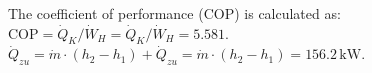 The coefficient of performance (COP) is calculated as:  
\( \text{COP} = \dot{Q}_K / \dot{W}_H = \dot{Q}_K / \dot{W}_H = 5.581 \).  
\( \dot{Q}_{zu} = \dot{m} \cdot (h_2 - h_1) + \dot{Q}_{zu} = \dot{m} \cdot (h_2 - h_1) = 156.2 \, \text{kW} \).